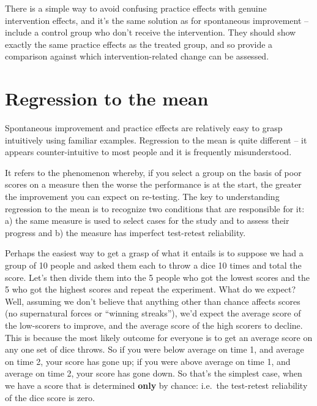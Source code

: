 \documentclass{krantz}
\begin{document}
There is a simple way to avoid confusing practice effects with genuine intervention effects, and it's the same solution as for spontaneous improvement -- include a control group who don't receive the intervention. They should show exactly the same practice effects as the treated group, and so provide a comparison against which intervention-related change can be assessed.

\hypertarget{regression-to-the-mean}{%
\section{Regression to the mean}\label{regression-to-the-mean}}

Spontaneous improvement and practice effects are relatively easy to grasp intuitively using familiar examples. Regression to the mean is quite different -- it appears counter-intuitive to most people and it is frequently misunderstood.

It refers to the phenomenon whereby, if you select a group on the basis of poor scores on a measure then the worse the performance is at the start, the greater the improvement you can expect on re-testing. The key to understanding regression to the mean is to recognize two conditions that are responsible for it: a) the same measure is used to select cases for the study and to assess their progress and b) the measure has imperfect test-retest reliability.

Perhaps the easiest way to get a grasp of what it entails is to suppose we had a group of 10 people and asked them each to throw a dice 10 times and total the score. Let's then divide them into the 5 people who got the lowest scores and the 5 who got the highest scores and repeat the experiment. What do we expect? Well, assuming we don't believe that anything other than chance affects scores (no supernatural forces or ``winning streaks''), we'd expect the average score of the low-scorers to improve, and the average score of the high scorers to decline. This is because the most likely outcome for everyone is to get an average score on any one set of dice throws. So if you were below average on time 1, and average on time 2, your score has gone up; if you were above average on time 1, and average on time 2, your score has gone down. So that's the simplest case, when we have a score that is determined \textbf{only} by chance: i.e.~the test-retest reliability of the dice score is zero.
\end{document}
